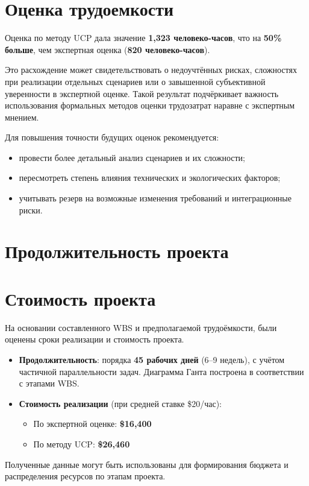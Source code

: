 \documentclass[14pt, russian]{matmex-diploma-custom}
\begin{document}
\section{Оценка трудоемкости}
Оценка по методу UCP дала значение \textbf{1,323 человеко-часов}, что на \textbf{50\% больше}, чем экспертная оценка (\textbf{820 человеко-часов}).

Это расхождение может свидетельствовать о недоучтённых рисках, сложностях при реализации отдельных сценариев или о завышенной субъективной уверенности в экспертной оценке. Такой результат подчёркивает важность использования формальных методов оценки трудозатрат наравне с экспертным мнением.

Для повышения точности будущих оценок рекомендуется:
\begin{itemize}
    \item провести более детальный анализ сценариев и их сложности;
    \item пересмотреть степень влияния технических и экологических факторов;
    \item учитывать резерв на возможные изменения требований и интеграционные риски.
\end{itemize}


\section{Продолжительность проекта}


\section{Стоимость проекта}
На основании составленного WBS и предполагаемой трудоёмкости, были оценены сроки реализации и стоимость проекта.

\begin{itemize}
    \item \textbf{Продолжительность}: порядка \textbf{45 рабочих дней} (6–9 недель), с учётом частичной параллельности задач. Диаграмма Ганта построена в соответствии с этапами WBS.
    \item \textbf{Стоимость реализации} (при средней ставке \$20/час):
    \begin{itemize}
        \item По экспертной оценке: \textbf{\$16,400}
        \item По методу UCP: \textbf{\$26,460}
    \end{itemize}
\end{itemize}

Полученные данные могут быть использованы для формирования бюджета и распределения ресурсов по этапам проекта.
\end{document}
